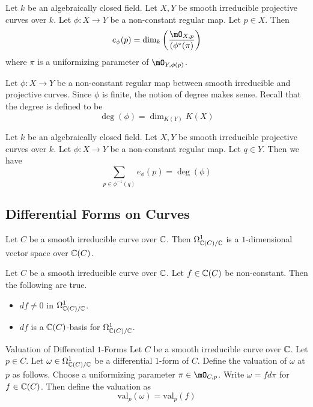 \documentclass[a4paper]{article}
\begin{document}
\begin{lmm}{}{} Let $k$ be an algebraically closed field. Let $X,Y$ be smooth irreducible projective curves over $k$. Let $\phi:X\to Y$ be a non-constant regular map. Let $p\in X$. Then $$e_\phi(p)=\dim_k\left(\frac{\mO_{X,p}}{(\phi^\ast(\pi)}\right)$$ where $\pi$ is a uniformizing parameter of $\mO_{Y,\phi(p)}$. 
\end{lmm}

Let $\phi:X\to Y$ be a non-constant regular map between smooth irreducible and projective curves. Since $\phi$ is finite, the notion of degree makes sense. Recall that the degree is defined to be $$\deg(\phi)=\dim_{K(Y)}K(X)$$

\begin{prp}{}{} Let $k$ be an algebraically closed field. Let $X,Y$ be smooth irreducible projective curves over $k$. Let $\phi:X\to Y$ be a non-constant regular map. Let $q\in Y$. Then we have $$\sum_{p\in\phi^{-1}(q)}e_\phi(p)=\deg(\phi)$$
\end{prp}

\subsection{Differential Forms on Curves}
\begin{prp}{}{} Let $C$ be a smooth irreducible curve over $\mathbb{C}$. Then $\Omega_{\mathbb{C}(C)/\mathbb{C}}^1$ is a $1$-dimensional vector space over $\mathbb{C}(C)$. 
\end{prp}

\begin{prp}{}{} Let $C$ be a smooth irreducible curve over $\mathbb{C}$. Let $f\in\mathbb{C}(C)$ be non-constant. Then the following are true. 
\begin{itemize}
\item $df\neq 0$ in $\Omega_{\mathbb{C}(C)/\mathbb{C}}^1$. 
\item $df$ is a $\mathbb{C}(C)$-basis for $\Omega_{\mathbb{C}(C)/\mathbb{C}}^1$. 
\end{itemize}
\end{prp}

\begin{defn}{Valuation of Differential $1$-Forms}{} Let $C$ be a smooth irreducible curve over $\mathbb{C}$. Let $p\in C$. Let $\omega\in\Omega_{\mathbb{C}(C)/\mathbb{C}}^1$ be a differential $1$-form of $C$. Define the valuation of $\omega$ at $p$ as follows. Choose a uniformizing parameter $\pi\in\mO_{C,p}$. Write $\omega=fd\pi$ for $f\in\mathbb{C}(C)$. Then define the valuation as $$\text{val}_p(\omega)=\text{val}_p(f)$$
\end{defn}
\end{document}
